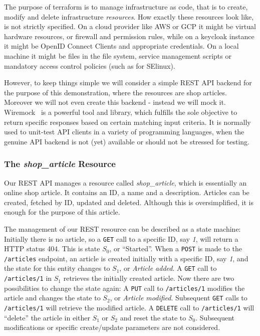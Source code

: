 \documentclass[paper=a4,fontsize=10pt,toc=listof,numbers=noenddot]{article}
\begin{document}
The purpose of terraform is to manage infrastructure as code, that is to create, modify and delete infrastructure \emph{resources}. How exactly these resources look like, is not strictly specified. On a cloud provider like AWS or GCP it might be virtual hardware resources, or firewall and permission rules, while on a keycloak instance it might be OpenID Connect Clients and appropriate credentials. On a local machine it might be files in the file system, service management scripts or mandatory access control policies (such as for SElinux).

However, to keep things simple we will consider a simple REST API backend for the purpose of this demonstration, where the resources are shop articles. Moreover we will not even create this backend - instead we will mock it. Wiremock~\cite{noauthor_wiremock_nodate} is a powerful tool and library, which fulfills the sole objective to return specific responses based on certain matching input criteria. It is normally used to unit-test API clients in a variety of programming languages, when the genuine API backend is not (yet) available or should not be stressed for testing.

\subsubsection{The \emph{shop\_article} Resource}
\label{subsubsec:empharticle-resource}

Our REST API manages a resource called \emph{shop\_article}, which is essentially an online shop article. It contains an ID, a name and a description. Articles can be created, fetched by ID, updated and deleted. Although this is oversimplified, it is enough for the purpose of this article.

The management of our REST resource can be described as a state machine: Initially there is no article, so a \verb'GET' call to a specific ID, say \emph{1}, will return a HTTP status 404. This is state $S_0$, or ``Started''. When a \verb'POST' is made to the \verb'/articles' endpoint, an article is created initially with a specific ID, say \emph{1}, and the state for this entity changes to $S_1$, or \emph{Article added}. A \verb'GET' call to \verb'/articles/1' in $S_1$ retrieves the initially created article. Now there are two possibilities to change the state again: A \verb'PUT' call to \verb'/articles/1' modifies the article and changes the state to $S_2$, or \emph{Article modified}. Subsequent \verb'GET' calls to \verb'/articles/1' will retrieve the modified article. A \verb'DELETE' call to \verb'/articles/1' will ``delete'' the article in either $S_1$ or $S_2$ and reset the state to $S_0$. Subsequent modifications or specific create/update parameters are not considered.
\end{document}

